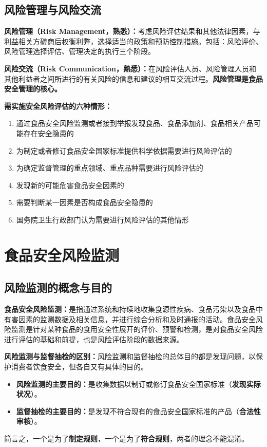 \subsection{风险管理与风险交流}

\begin{defbox}
\textbf{风险管理（Risk Management，熟悉）：}考虑风险评估结果和其他法律因素，与利益相关方磋商后权衡利弊，选择适当的政策和预防控制措施。包括：风险评价、风险管理选择评估、管理决定的执行三个阶段。

\textbf{风险交流（Risk Communication，熟悉）：}在风险评估人员、风险管理人员和其他利益者之间所进行的有关风险的信息和建议的相互交流过程。\textbf{风险管理是食品安全管理的核心。}

\textbf{需实施安全风险评估的六种情形：}
\begin{enumerate}[leftmargin=*]
    \item 通过食品安全风险监测或者接到举报发现食品、食品添加剂、食品相关产品可能存在安全隐患的
    \item 为制定或者修订食品安全国家标准提供科学依据需要进行风险评估的
    \item 为确定监督管理的重点领域、重点品种需要进行风险评估的
    \item 发现新的可能危害食品安全因素的
    \item 需要判断某一因素是否构成食品安全隐患的
    \item 国务院卫生行政部门认为需要进行风险评估的其他情形
\end{enumerate}
\end{defbox}

\section{食品安全风险监测}

\subsection{风险监测的概念与目的}

\begin{defbox}
\textbf{食品安全风险监测：}是指通过系统和持续地收集食源性疾病、食品污染以及食品中有害因素的监测数据及相关信息，并进行综合分析和及时通报的活动。食品安全风险监测是针对某种食品的食用安全性展开的评价、预警和检测，是对食品安全风险进行评估的基础和前提，也是风险评估阶段的数据来源。

\textbf{风险监测与监督抽检的区别：}风险监测和监督抽检的总体目的都是发现问题，以保护消费者饮食安全，但各自又有具体的目的。
\begin{itemize}[leftmargin=*]
    \item \textbf{风险监测的主要目的：}是收集数据以制订或修订食品安全国家标准（\textbf{发现实际状况}）。
    \item \textbf{监督抽检的主要目的：}是发现不符合现有的食品安全国家标准的产品（\textbf{合法性审核}）。
\end{itemize}
简言之，一个是为了\textbf{制定规则}，一个是为了\textbf{符合规则}，两者的理念不能混淆。
\end{defbox}

